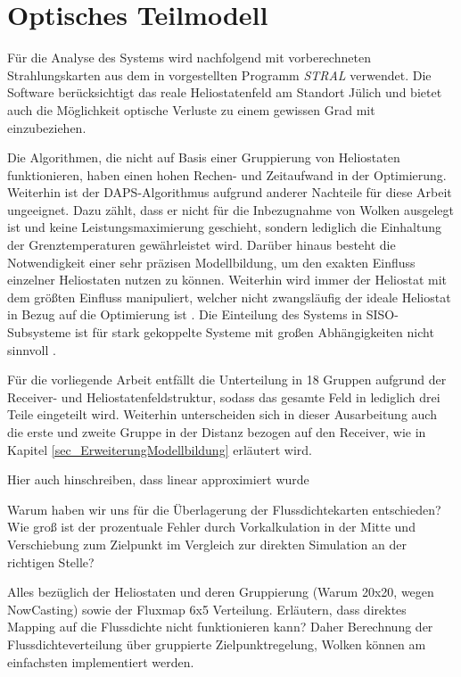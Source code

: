 \section{Optisches Teilmodell} \label{sec_optischesModell}
Für die Analyse des Systems wird nachfolgend mit vorberechneten Strahlungskarten aus dem in \cite[S.53ff]{DissBelhomme} vorgestellten Programm \textit{STRAL} verwendet.
Die Software berücksichtigt das reale Heliostatenfeld am Standort Jülich und bietet auch die Möglichkeit optische Verluste zu einem gewissen Grad mit einzubeziehen.

Die Algorithmen, die nicht auf Basis einer Gruppierung von Heliostaten funktionieren, haben einen hohen Rechen- und Zeitaufwand in der Optimierung.
Weiterhin ist der DAPS-Algorithmus aufgrund anderer Nachteile für diese Arbeit ungeeignet.
Dazu zählt, dass er nicht für die Inbezugnahme von Wolken ausgelegt ist und keine Leistungsmaximierung geschieht, sondern lediglich die Einhaltung der Grenztemperaturen gewährleistet wird.
Darüber hinaus besteht die Notwendigkeit einer sehr präzisen Modellbildung, um den exakten Einfluss einzelner Heliostaten nutzen zu können.
Weiterhin wird immer der Heliostat mit dem größten Einfluss manipuliert, welcher nicht zwangsläufig der ideale Heliostat in Bezug auf die Optimierung ist \cite[S.35]{DissOberkirsch}.
Die Einteilung des Systems in SISO-Subsysteme ist für stark gekoppelte Systeme mit großen Abhängigkeiten nicht sinnvoll \cite[S.33]{DissZanger}.

Für die vorliegende Arbeit entfällt die Unterteilung in 18 Gruppen aufgrund der Receiver- und Heliostatenfeldstruktur, sodass das gesamte Feld in lediglich drei Teile eingeteilt wird.
Weiterhin unterscheiden sich in dieser Ausarbeitung auch die erste und zweite Gruppe in der Distanz bezogen auf den Receiver, wie in Kapitel \ref{sec_ErweiterungModellbildung} erläutert wird.


Hier auch hinschreiben, dass linear approximiert wurde

Warum haben wir uns für die Überlagerung der Flussdichtekarten entschieden?
Wie groß ist der prozentuale Fehler durch Vorkalkulation in der Mitte und Verschiebung zum Zielpunkt im Vergleich zur direkten Simulation an der richtigen Stelle?



Alles bezüglich der Heliostaten und deren Gruppierung (Warum 20x20, wegen NowCasting) sowie der Fluxmap 6x5 Verteilung.
Erläutern, dass direktes Mapping auf die Flussdichte nicht funktionieren kann?
Daher Berechnung der Flussdichteverteilung über gruppierte Zielpunktregelung, Wolken können am einfachsten implementiert werden.

